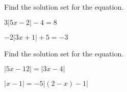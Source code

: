 \vfill
\begin{center}\hfill
\end{center}

\newpage

\begin{exercise}
	Find the solution set for the equation. %

	\noindent
	\begin{enumerate*}[label=\textup{(\arabic*)~}]
		\item  $3|5x - 2|-4 = 8$
		\item  $-2|3x + 1| + 5= -3$ \hfill\null
	\end{enumerate*}
\end{exercise}

\vfill
\begin{center}\hfill
\end{center}

\begin{exercise}
	Find the solution set for the equation. %

	\noindent
	\begin{enumerate*}[label=\textup{(\arabic*)~}]
		\item  $|5x-12|=|3x-4|$
		\item  $|x-1|=-5|(2-x)-1|$ \hfill\null
	\end{enumerate*}
\end{exercise}

\vfill
\begin{center}\hfill
\end{center}


